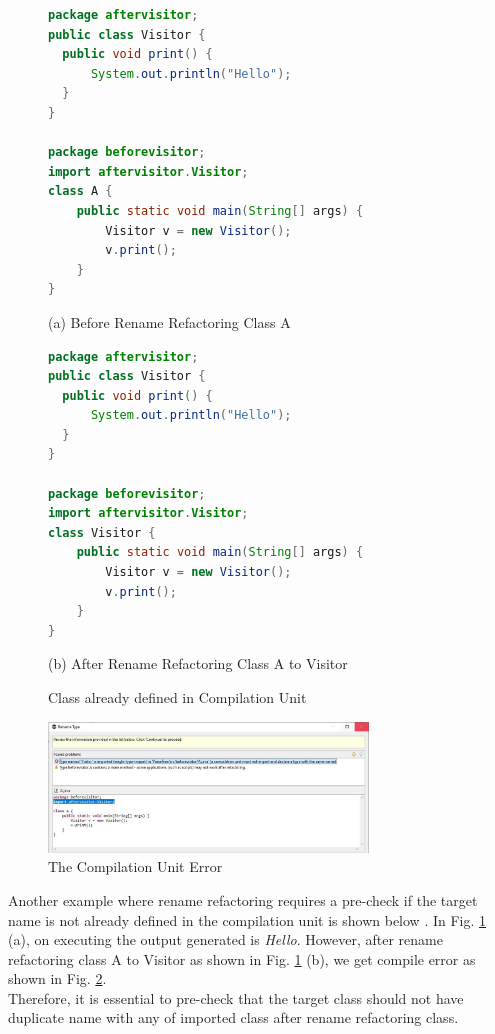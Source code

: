 \begin{figure}[th]
\centering
\begin{minipage}[t]{0.75\linewidth}
\begin{lstlisting}[language=java, basicstyle=\scriptsize\ttfamily,frame=single]
package aftervisitor;
public class Visitor {
  public void print() {
      System.out.println("Hello");
  }
}

package beforevisitor;
import aftervisitor.Visitor;
class A {
    public static void main(String[] args) {
        Visitor v = new Visitor();
        v.print();
    }
}

\end{lstlisting}
\tiny{(a) Before Rename Refactoring Class A}
\end{minipage}
\hfill

\begin{minipage}[t]{0.75\linewidth}
\begin{lstlisting}[language=java, basicstyle=\scriptsize\ttfamily,frame=single]
package aftervisitor;
public class Visitor {
  public void print() {
      System.out.println("Hello");
  }
}

package beforevisitor;
import aftervisitor.Visitor;
class Visitor {
    public static void main(String[] args) {
        Visitor v = new Visitor();
        v.print();
    }
}
\end{lstlisting}
\tiny{(b) After Rename Refactoring Class A to Visitor}
\end{minipage}
\caption{Class already defined in Compilation Unit}
\label{figure:error}
\end{figure}


\begin{figure}[H]
\centerline{\includegraphics[width=85mm,scale=0.5]{CUE.jpg}}
\caption{The Compilation Unit Error}
\label{figure:pic}
\end{figure}

Another example where rename refactoring requires a pre-check if the target name is not already defined in the compilation unit is shown below . In Fig. \ref{figure:error} (a), on executing the output generated is \textit{Hello}. However, after rename refactoring class A to Visitor as shown in Fig. \ref{figure:error} (b), we get compile error as shown in Fig. \ref{figure:pic}.
\\Therefore, it is essential to pre-check that the target class should not have duplicate name with any of imported class after rename refactoring class. 




